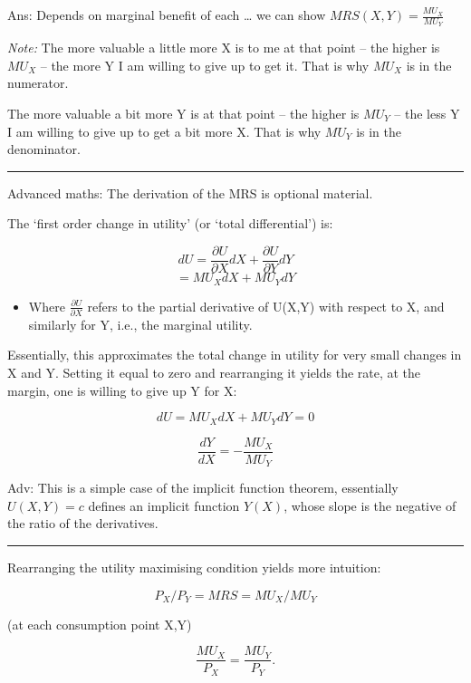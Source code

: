 \documentclass[]{article}
\providecommand{\tightlist}{%
  \setlength{\itemsep}{0pt}\setlength{\parskip}{0pt}}
\begin{document}
Ans: Depends on marginal benefit of each \ldots{} we can show \(MRS(X,Y)=\frac{MU_{X}}{MU_{Y}}\)

\emph{Note:}
The more valuable a little more X is to me at that point -- the higher is \(MU_X\) -- the more Y I am willing to give up to get it.
That is why \(MU_X\) is in the numerator.

The more valuable a bit more Y is at that point -- the higher is \(MU_Y\) -- the less Y I am willing to give up to get a bit more X. That is why \(MU_Y\) is in the denominator.

\begin{center}\rule{0.5\linewidth}{\linethickness}\end{center}

\textcolor{RawSienna}{Advanced maths: The derivation of the MRS is optional material.}

The `first order change in utility' (or `total differential') is:

\[ dU  = \frac{\partial U}{\partial X}dX + \frac{\partial U}{\partial Y}dY\]
\[ = MU_{X}dX + MU_{Y}dY\]

\begin{itemize}
\tightlist
\item
  Where \(\frac{\partial U}{\partial X}\) refers to the partial derivative of U(X,Y) with respect to X, and similarly for Y, i.e., the marginal utility.
\end{itemize}

Essentially, this approximates the total change in utility for very small changes in X and Y.
Setting it equal to zero and rearranging it yields the rate, at the margin, one is willing to give up Y for X:

\[dU  = MU_{X}dX + MU_{Y}dY = 0 \]

\[\frac{dY}{dX}=-\frac{MU_{X}}{MU_{Y}}\]

\textcolor{RawSienna}{Adv: This is a simple case of the implicit function theorem, essentially $U(X,Y)=c$ defines an implicit function $Y(X)$, whose slope is the negative of the ratio of the derivatives.}

\begin{center}\rule{0.5\linewidth}{\linethickness}\end{center}

Rearranging the utility maximising condition yields more intuition:

\[P_X/P_Y = MRS = MU_X/MU_Y\]

(at each consumption point X,Y)

\[\frac{MU_X}{P_X} = \frac{MU_Y}{P_Y}.\]
\end{document}
